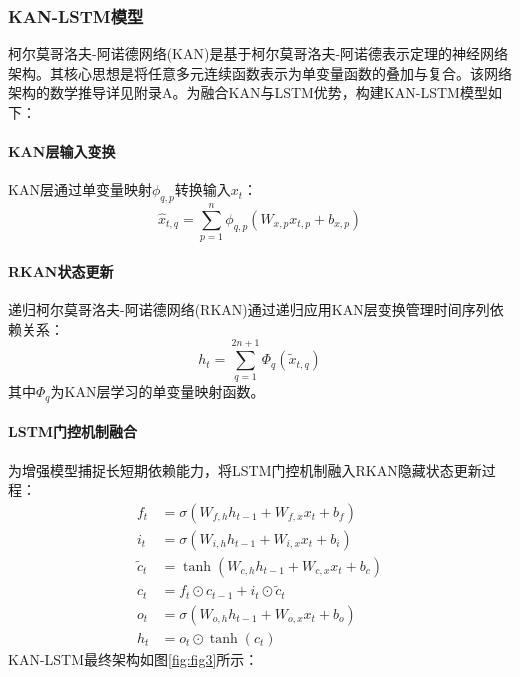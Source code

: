 \documentclass[lang=cn,12pt,a4paper]{elegantpaper}
\begin{document}
\subsubsection{KAN-LSTM模型}
\label{subsubsec:kan_lstm_model}

柯尔莫哥洛夫-阿诺德网络(KAN)是基于柯尔莫哥洛夫-阿诺德表示定理的神经网络架构。其核心思想是将任意多元连续函数表示为单变量函数的叠加与复合\citep{Ismailov2008,Genet2024}。该网络架构的数学推导详见附录A。为融合KAN与LSTM优势，构建KAN-LSTM模型如下：

\paragraph{KAN层输入变换}  
KAN层通过单变量映射$\phi_{q,p}$转换输入$x_t$：  
\begin{equation}
\hat{x}_{t,q} = \sum_{p=1}^{n} \phi_{q,p} \left( W_{x,p} x_{t,p} + b_{x,p} \right)
\end{equation}

\paragraph{RKAN状态更新}  
递归柯尔莫哥洛夫-阿诺德网络(RKAN)通过递归应用KAN层变换管理时间序列依赖关系：  
\begin{equation}
h_t = \sum_{q=1}^{2n+1} \Phi_q(\tilde{x}_{t,q})
\end{equation}
其中$\Phi_q$为KAN层学习的单变量映射函数。

\paragraph{LSTM门控机制融合}  
为增强模型捕捉长短期依赖能力，将LSTM门控机制融入RKAN隐藏状态更新过程：  
\begin{align}
f_t &= \sigma(W_{f,h}h_{t-1} + W_{f,x}x_t + b_f) \\
i_t &= \sigma(W_{i,h}h_{t-1} + W_{i,x}x_t + b_i) \\
\tilde{c}_t &= \tanh(W_{c,h}h_{t-1} + W_{c,x}x_t + b_c) \\
c_t &= f_t \odot c_{t-1} + i_t \odot \tilde{c}_t \\
o_t &= \sigma(W_{o,h}h_{t-1} + W_{o,x}x_t + b_o) \\
h_t &= o_t \odot \tanh(c_t)
\end{align}
KAN-LSTM最终架构如图\ref{fig:fig3}所示：
\end{document}
